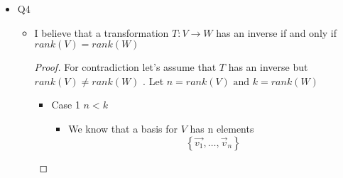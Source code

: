 \documentclass[11pt]{book}
\begin{document}
\begin{itemize}
\begin{itemize}
        \end{itemize}
    \item Q4
        \begin{itemize}
            \item I believe that a transformation $T : V \to W $   has an inverse if and only if $\mathit{rank} \left(V\right) = \mathit{rank} \left(W\right) $ 
            \begin{proof}
                For contradiction let's assume that $T$ has an inverse but $\mathit{rank} \left(V\right) \neq \mathit{rank} \left(W\right) $ . Let $n= \mathit{rank} \left(V\right) \text{ and } k= \mathit{rank} \left(W\right) $ 
                \begin{itemize}
                    \item Case 1 $n < k$ 
                        \begin{itemize}
                            \item We know that a basis for $V$ has n elements
                            \[
                            \left\{ \vec{v_1} , \ldots, \vec{v }_{n}   \right\} 
                            \]
                            

\end{itemize}
\end{itemize}
\end{proof}
\end{itemize}
\end{itemize}
\end{document}
